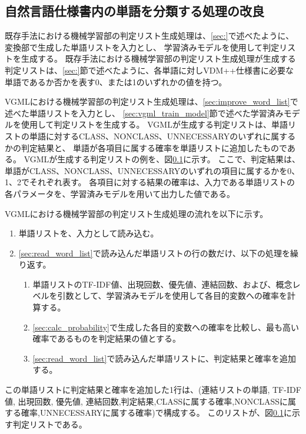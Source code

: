 \subsection{自然言語仕様書内の単語を分類する処理の改良}
既存手法における機械学習部の判定リスト生成処理は、\ref{sec:}で述べたように、変換部で生成した単語リストを入力とし、
学習済みモデルを使用して判定リストを生成する。
既存手法における機械学習部の判定リスト生成処理が生成する判定リストは、\ref{sec:}節で述べたように、各単語に対しVDM++仕様書に必要な単語であるか否かを表す0、または1のいずれかの値を持つ。

VGMLにおける機械学習部の判定リスト生成処理は、\ref{sec:improve_word_list}で述べた単語リストを入力とし、
\ref{sec:vgml_train_model}節で述べた学習済みモデルを使用して判定リストを生成する。
VGMLが生成する判定リストは、単語リストの単語に対するCLASS、NONCLASS、UNNECESSARYのいずれに属するかの判定結果と、
単語が各項目に属する確率を単語リストに追加したものである。
VGMLが生成する判定リストの例を、図\ref{}に示す。
ここで、判定結果は、単語がCLASS、NONCLASS、UNNECESSARYのいずれの項目に属するかを0、1、2でそれぞれ表す。
各項目に対する結果の確率は、入力である単語リストの各パラメータを、学習済みモデルを用いて出力した値である。

VGMLにおける機械学習部の判定リスト生成処理の流れを以下に示す。

\begin{enumerate}
    \item 単語リストを、入力として読み込む。
    \label{sec:read_word_list}
    \item \ref{sec:read_word_list}で読み込んだ単語リストの行の数だけ、以下の処理を繰り返す。
        \begin{enumerate}
            \item 単語リストのTF-IDF値、出現回数、優先値、連結回数、および、概念レベルを引数として、学習済みモデルを使用して各目的変数への確率を計算する。
            \label{sec:calc_probability}
            \item \ref{sec:calc_probability}で生成した各目的変数への確率を比較し、最も高い確率であるものを判定結果の値とする。
            \item \ref{sec:read_word_list}で読み込んだ単語リストに、判定結果と確率を追加する。
        \end{enumerate}
\end{enumerate}

この単語リストに判定結果と確率を追加した1行は、(連結リストの単語, TF-IDF値, 出現回数, 優先値, 連結回数,判定結果,CLASSに属する確率,NONCLASSに属する確率,UNNECESSARYに属する確率)で構成する。
このリストが、図\ref{}に示す判定リストである。

